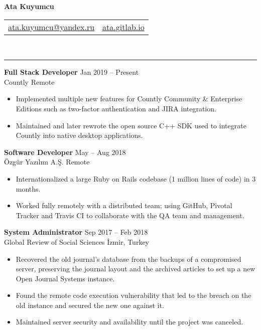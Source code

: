 \documentclass[a4paper, 12pt]{article}
\newcommand{\resumeSection}[1]{\vspace{12pt}{\Large \bfseries #1} \vspace{-9pt} \\ \rule{\textwidth}{0.7pt}}
\newcommand{\resumeSubsection}[1]{\textbf{#1}}
\begin{document}
	\begin{center}
		{\huge \bfseries Ata Kuyumcu}

		\begin{tabular}{c c}
			\href{mailto:ata.kuyumcu@yandex.ru}{ata.kuyumcu@yandex.ru} &
			\href{https://ata.gitlab.io}{ata.gitlab.io}
			
		\end{tabular}
	\end{center}

	\vspace{-20pt}
	\resumeSection{Experience}
	
	\resumeSubsection{Full Stack Developer} \hfill Jan 2019  – Present \\
	Countly \hfill Remote
	
	\begin{itemize}
		\item Implemented multiple new features for Countly Community \& Enterprise Editions such as two-factor authentication and JIRA integration.
		\item Maintained and later rewrote the open source C++ SDK used to integrate Countly into native desktop applications.
	\end{itemize}

	\resumeSubsection{Software Developer} \hfill May – Aug 2018 \\
	Özgür Yazılım A.Ş. \hfill Remote
		
	\begin{itemize}
		\item Internationalized a large Ruby on Rails codebase (1 million lines of code) in 3 months.
		\item Worked fully remotely with a distributed team; using GitHub, Pivotal Tracker and Travis CI to collaborate with the QA team and management.
	\end{itemize}

	\resumeSubsection{System Administrator} \hfill Sep 2017 – Feb 2018 \\
	Global Review of Social Sciences \hfill İzmir, Turkey
	
	\begin{itemize}
		\item Recovered the old journal’s database from the backups of a compromised server, preserving the journal layout and the archived articles to set up a new Open Journal Systems instance.
		\item Found the remote code execution vulnerability that led to the breach on the old instance and secured the new one against it.
		\item Maintained server security and availability until the project was canceled.
	\end{itemize}
	
\end{document}
